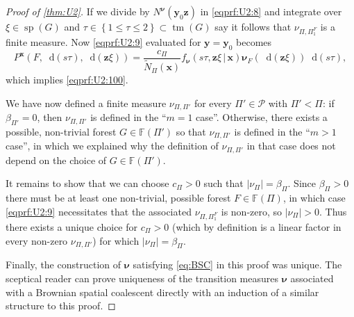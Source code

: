 \documentclass[reqno,draft]{amsart}
\numberwithin{equation}{section}
\theoremstyle{plain}
\theoremstyle{remark}
\newcommand*\diff{\mathop{}\!\mathrm{d}}
\newcommand{\fpart}{\Pi} %
\DeclareMathOperator{\dct}{tm}
\DeclareMathOperator{\dcs}{sp}
\newcommand{\fnu}{f_{\boldsymbol \nu}}
\newcommand{\nn}{\widetilde{N}} %
\newcommand{\la}{\beta} %
\newcommand{\nut}[1]{|\nu_{#1}|}
\begin{document}
\begin{proof}[Proof of \cref{thm:U2}]
    If we divide by $N^{\boldsymbol \nu}(\boldsymbol y_0\boldsymbol z)$ in \cref{eqprf:U2:8} and integrate over $\xi \in \dcs(G)$ and $\tau \in \left\{ 1 \le \tau \le 2 \right\} \subset \dct(G)$ say it follows that $\nu_{\fpart,\fpart_1^F}$ is a finite measure.
    Now \cref{eqprf:U2:9} evaluated for $\boldsymbol y = \boldsymbol y_0$ becomes
    \begin{equation*}
        P^{\boldsymbol x}(F,\diff (s\tau),\diff (\boldsymbol z\xi)) = \frac{c_\fpart}{\nn_\fpart(\boldsymbol x)} \fnu(s\tau,\boldsymbol z\xi \,\vert\, \boldsymbol x) \boldsymbol \nu_F(\diff (\boldsymbol z\xi)) \diff (s\tau),
    \end{equation*}
    which implies \cref{eqprf:U2:100}.

    We have now defined a finite measure $\nu_{\fpart,\fpart'}$ for every $\fpart'\in \mathcal{P}$ with $\fpart' < \fpart$: if $\la_{\fpart'} = 0$, then $\nu_{\fpart,\fpart'}$ is defined in the ``$m=1$ case''. Otherwise, there exists a possible, non-trivial forest $G \in \mathbb{F}(\fpart')$ so that $\nu_{\fpart,\fpart'}$ is defined in the ``$m>1$ case'', in which we explained why the definition of $\nu_{\fpart,\fpart'}$ in that case does not depend on the choice of $G\in \mathbb{F}(\fpart')$.

    It remains to show that we can choose $c_\fpart > 0$ such that $\nut{\fpart} = \la_\fpart$. Since $\la_\fpart > 0$ there must be at least one non-trivial, possible forest $F\in \mathbb{F}(\fpart)$, in which case \cref{eqprf:U2:9} necessitates that the associated $\nu_{\fpart,\fpart_1^F}$ is non-zero, so $\nut{\fpart} > 0$. Thus there exists a unique choice for $c_\fpart > 0$ (which by definition is a linear factor in every non-zero $\nu_{\fpart,\fpart'}$) for which $\nut{\fpart} = \la_\fpart$.

    Finally, the construction of $\boldsymbol \nu$ satisfying \cref{eq:BSC} in this proof was unique. The sceptical reader can prove uniqueness of the transition measures $\boldsymbol \nu$ associated with a Brownian spatial coalescent directly with an induction of a similar structure to this proof.
\end{proof}
\end{document}
